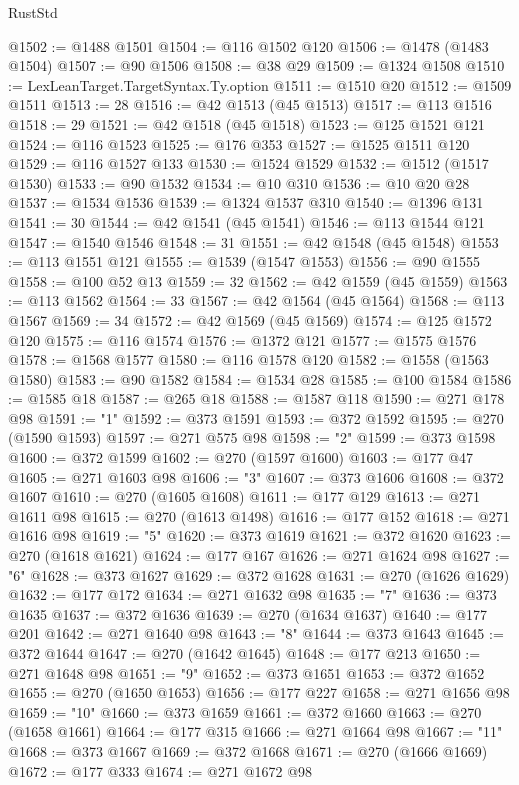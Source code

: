 \begin{lexlean}{RustStd}
\begin{coremodule}
@1502 := @1488 @1501
@1504 := @116 @1502 @120
@1506 := @1478 (@1483 @1504)
@1507 := @90 @1506
@1508 := @38 @29
@1509 := @1324 @1508
@1510 := LexLeanTarget.TargetSyntax.Ty.option
@1511 := @1510 @20
@1512 := @1509 @1511
@1513 := 28
@1516 := @42 @1513 (@45 @1513)
@1517 := @113 @1516
@1518 := 29
@1521 := @42 @1518 (@45 @1518)
@1523 := @125 @1521 @121
@1524 := @116 @1523
@1525 := @176 @353
@1527 := @1525 @1511 @120
@1529 := @116 @1527 @133
@1530 := @1524 @1529
@1532 := @1512 (@1517 @1530)
@1533 := @90 @1532
@1534 := @10 @310
@1536 := @10 @20 @28
@1537 := @1534 @1536
@1539 := @1324 @1537 @310
@1540 := @1396 @131
@1541 := 30
@1544 := @42 @1541 (@45 @1541)
@1546 := @113 @1544 @121
@1547 := @1540 @1546
@1548 := 31
@1551 := @42 @1548 (@45 @1548)
@1553 := @113 @1551 @121
@1555 := @1539 (@1547 @1553)
@1556 := @90 @1555
@1558 := @100 @52 @13
@1559 := 32
@1562 := @42 @1559 (@45 @1559)
@1563 := @113 @1562
@1564 := 33
@1567 := @42 @1564 (@45 @1564)
@1568 := @113 @1567
@1569 := 34
@1572 := @42 @1569 (@45 @1569)
@1574 := @125 @1572 @120
@1575 := @116 @1574
@1576 := @1372 @121
@1577 := @1575 @1576
@1578 := @1568 @1577
@1580 := @116 @1578 @120
@1582 := @1558 (@1563 @1580)
@1583 := @90 @1582
@1584 := @1534 @28
@1585 := @100 @1584
@1586 := @1585 @18
@1587 := @265 @18
@1588 := @1587 @118
@1590 := @271 @178 @98
@1591 := "1"
@1592 := @373 @1591
@1593 := @372 @1592
@1595 := @270 (@1590 @1593)
@1597 := @271 @575 @98
@1598 := "2"
@1599 := @373 @1598
@1600 := @372 @1599
@1602 := @270 (@1597 @1600)
@1603 := @177 @47
@1605 := @271 @1603 @98
@1606 := "3"
@1607 := @373 @1606
@1608 := @372 @1607
@1610 := @270 (@1605 @1608)
@1611 := @177 @129
@1613 := @271 @1611 @98
@1615 := @270 (@1613 @1498)
@1616 := @177 @152
@1618 := @271 @1616 @98
@1619 := "5"
@1620 := @373 @1619
@1621 := @372 @1620
@1623 := @270 (@1618 @1621)
@1624 := @177 @167
@1626 := @271 @1624 @98
@1627 := "6"
@1628 := @373 @1627
@1629 := @372 @1628
@1631 := @270 (@1626 @1629)
@1632 := @177 @172
@1634 := @271 @1632 @98
@1635 := "7"
@1636 := @373 @1635
@1637 := @372 @1636
@1639 := @270 (@1634 @1637)
@1640 := @177 @201
@1642 := @271 @1640 @98
@1643 := "8"
@1644 := @373 @1643
@1645 := @372 @1644
@1647 := @270 (@1642 @1645)
@1648 := @177 @213
@1650 := @271 @1648 @98
@1651 := "9"
@1652 := @373 @1651
@1653 := @372 @1652
@1655 := @270 (@1650 @1653)
@1656 := @177 @227
@1658 := @271 @1656 @98
@1659 := "10"
@1660 := @373 @1659
@1661 := @372 @1660
@1663 := @270 (@1658 @1661)
@1664 := @177 @315
@1666 := @271 @1664 @98
@1667 := "11"
@1668 := @373 @1667
@1669 := @372 @1668
@1671 := @270 (@1666 @1669)
@1672 := @177 @333
@1674 := @271 @1672 @98

\end{coremodule}
\end{lexlean}
